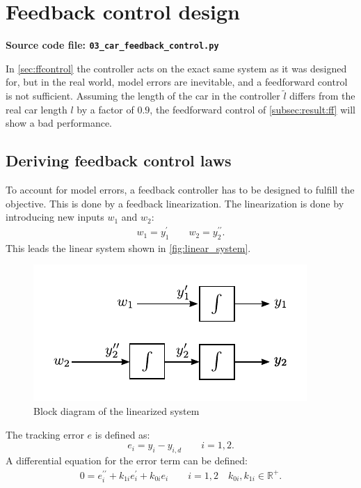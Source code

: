 \documentclass[a4paper,12pt,headinclude=true,headsepline,parskip=half,DIV=12]{scrartcl}
\newcommand{\R}{\mathbb{R}} %
\newcommand{\code}[1]{\lstinline[basicstyle=\normalsize\sffamily]|#1|}
\begin{document}
\section{Feedback control design} \label{sec:fbcontrol}

\textbf{Source code file: \code{03_car_feedback_control.py}}

In \autoref{sec:ffcontrol} the controller acts on the exact same system as it was designed for, but in the real world, model errors are inevitable, and a feedforward control is not sufficient. Assuming the length of the car in the controller $\tilde{l}$ differs from the real car length $l$ by a factor of $0.9$, the feedforward control of \autoref{subsec:result:ff} will show a bad performance.



\subsection{Deriving feedback control laws}
To account for model errors, a feedback controller has to be designed to fulfill the objective. This is done by a feedback linearization.
The linearization is done by introducing new inputs $w_1$ and $w_2$:
\begin{align}
  \label{eq:new_inputs}
  w_1 = y_1^\prime \qquad w_2 = y_2^{\prime\prime}.
\end{align}
This leads the linear system shown in \autoref{fig:linear_system}.
\begin{figure}[ht]
  \centering
  \includegraphics[scale=1]{img/linear_system.pdf}
  \caption{Block diagram of the linearized system}
  \label{fig:linear_system}
\end{figure}
The tracking error $e$ is defined as:
\begin{equation}
  \label{eq:error}
  e_i = y_i-y_{i,d} \qquad i = 1,2.
\end{equation}
A differential equation for the error term can be defined:
\begin{align}
  \label{eq:error_ode}
  0 = e_i^{\prime\prime}+k_{1i}e_i^{\prime}+k_{0i}e_i \qquad i = 1,2 \quad k_{0i},k_{1i} \in \R^+.
\end{align}
\end{document}
